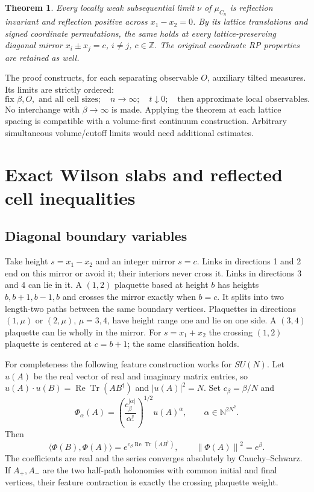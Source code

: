 \documentclass[11pt]{article}
\newtheorem{theorem}{Theorem}[section]
\theoremstyle{remark}
\newcommand{\tr}{\operatorname{Tr}}
\newcommand{\norm}[1]{\left\|#1\right\|}
\newcommand{\Z}{\mathbb Z}
\begin{document}
\begin{theorem}\label{thm:main}
Every locally weak subsequential limit $\nu$ of $\mu_{C_n}$ is
reflection invariant and reflection positive across
$x_1-x_2=0$. By its lattice translations and signed coordinate
permutations, the same holds at every lattice-preserving diagonal
mirror $x_i\pm x_j=c$, $i\ne j$, $c\in\Z$.
The original coordinate RP properties are retained as well.
\end{theorem}

The proof constructs, for each separating observable $O$, auxiliary
tilted measures. Its limits are strictly ordered:
\[
 \text{fix }\beta,O,\text{ and all cell sizes};\quad
 n\longrightarrow\infty;\quad t\downarrow0;
 \quad\text{then approximate local observables.}
 \tag{1.3}
\]
No interchange with $\beta\to\infty$ is made. Applying the theorem
at each lattice spacing is compatible with a volume-first continuum
construction. Arbitrary simultaneous volume/cutoff limits would need
additional estimates.

\section{Exact Wilson slabs and reflected cell inequalities}

\subsection{Diagonal boundary variables}
Take height $s=x_1-x_2$ and an integer mirror $s=c$.
Links in directions 1 and 2 end on this mirror or avoid it; their
interiors never cross it. Links in directions 3 and 4 can lie in it.
A $(1,2)$ plaquette based at height $b$ has heights
$b,b+1,b-1,b$ and crosses the mirror exactly when $b=c$.
It splits into two length-two paths between the same boundary vertices.
Plaquettes in directions $(1,\mu)$ or $(2,\mu)$, $\mu=3,4$,
have height range one and lie on one side. A $(3,4)$ plaquette
can lie wholly in the mirror. For $s=x_1+x_2$ the crossing
$(1,2)$ plaquette is centered at $c=b+1$; the same classification holds.

For completeness the following feature construction works for $SU(N)$.
Let $u(A)$ be the real vector of real and imaginary matrix entries, so
$u(A)\cdot u(B)=\operatorname{Re}\tr(AB^\dagger)$ and
$|u(A)|^2=N$. Set $c_\beta=\beta/N$ and
\[
 \Phi_\alpha(A)=
 \left(\frac{c_\beta^{|\alpha|}}{\alpha!}\right)^{1/2}
 u(A)^\alpha,\qquad \alpha\in\mathbb N^{2N^2}.
\]
Then
\[
 \langle\Phi(B),\Phi(A)\rangle
 =e^{c_\beta\operatorname{Re}\tr(AB^\dagger)},
 \qquad\norm{\Phi(A)}^2=e^\beta.
 \tag{2.1}
\]
The coefficients are real and the series converges absolutely by
Cauchy--Schwarz. If $A_+,A_-$ are the two half-path holonomies with
common initial and final vertices, their feature contraction is exactly
the crossing plaquette weight.
\end{document}
